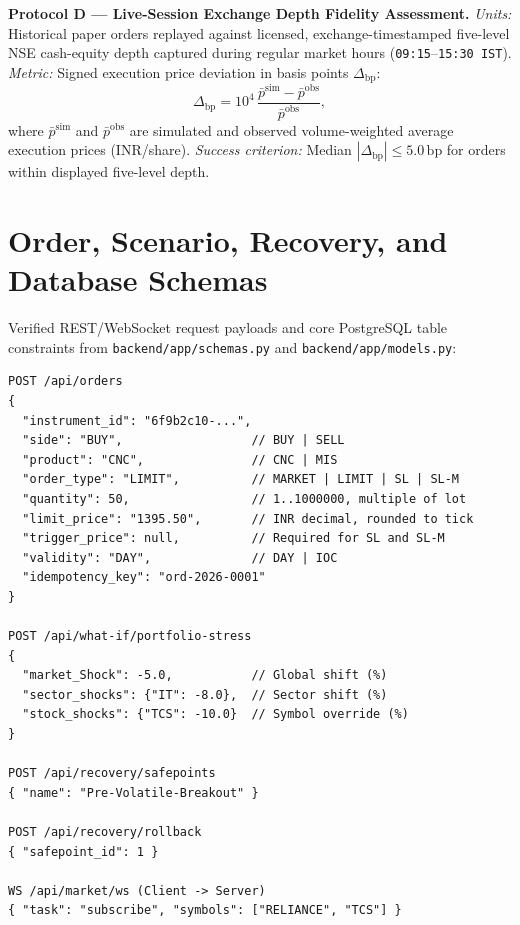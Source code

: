 \documentclass[12pt]{article}
\newcommand{\appendices}{\appendix}
\newcommand{\thinunit}[2]{#1\,\text{#2}}
\renewcommand{\thesection}{\arabic{section}}
\begin{document}
\textbf{Protocol D --- Live-Session Exchange Depth Fidelity Assessment.} \emph{Units:} Historical paper orders replayed against licensed, exchange-timestamped five-level NSE cash-equity depth captured during regular market hours (\texttt{09:15}--\texttt{15:30~IST}). \emph{Metric:} Signed execution price deviation in basis points $\Delta_{\mathrm{bp}}$:
\begin{equation}
\Delta_{\mathrm{bp}} = 10^{4}\,\frac{\bar{p}^{\mathrm{sim}}-\bar{p}^{\mathrm{obs}}}{\bar{p}^{\mathrm{obs}}},
\label{eq:metricD}
\end{equation}
where $\bar{p}^{\mathrm{sim}}$ and $\bar{p}^{\mathrm{obs}}$ are simulated and observed volume-weighted average execution prices (INR/share). \emph{Success criterion:} Median $|\Delta_{\mathrm{bp}}| \le \thinunit{5.0}{bp}$ for orders within displayed five-level depth.

\appendices
\renewcommand{\thesection}{Appendix \Alph{section}}
\section{Order, Scenario, Recovery, and Database Schemas}

Verified REST/WebSocket request payloads and core PostgreSQL table constraints from \texttt{backend/app/schemas.py} and \texttt{backend/app/models.py}:

\begin{lstlisting}
POST /api/orders
{
  "instrument_id": "6f9b2c10-...",
  "side": "BUY",                  // BUY | SELL
  "product": "CNC",               // CNC | MIS
  "order_type": "LIMIT",          // MARKET | LIMIT | SL | SL-M
  "quantity": 50,                 // 1..1000000, multiple of lot
  "limit_price": "1395.50",       // INR decimal, rounded to tick
  "trigger_price": null,          // Required for SL and SL-M
  "validity": "DAY",              // DAY | IOC
  "idempotency_key": "ord-2026-0001"
}

POST /api/what-if/portfolio-stress
{
  "market_Shock": -5.0,           // Global shift (%)
  "sector_shocks": {"IT": -8.0},  // Sector shift (%)
  "stock_shocks": {"TCS": -10.0}  // Symbol override (%)
}

POST /api/recovery/safepoints
{ "name": "Pre-Volatile-Breakout" }

POST /api/recovery/rollback
{ "safepoint_id": 1 }

WS /api/market/ws (Client -> Server)
{ "task": "subscribe", "symbols": ["RELIANCE", "TCS"] }
\end{lstlisting}
\end{document}
